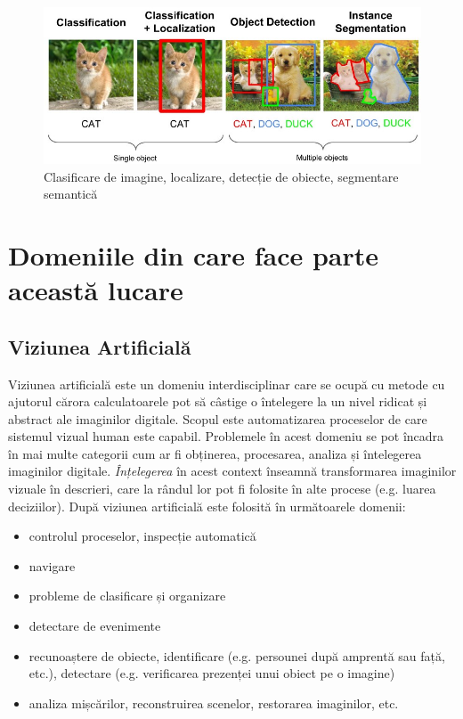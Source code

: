 \begin{figure}[h!]
    	\centering
	\captionsetup{justification=centering, margin=2cm}
	\includegraphics[width=1.0\textwidth]{figures/class_detect_segment.jpeg}
	\caption{Clasificare de imagine, localizare, detecție de obiecte, segmentare semantică \cite{class_detect_segment}}
	\label{fig:class_detect_semgent}
\end{figure}
\section{Domeniile din care face parte această lucare}
\subsection{Viziunea Artificială}
Viziunea artificială este un domeniu interdisciplinar care se ocupă cu metode cu ajutorul cărora calculatoarele pot să câstige o întelegere la un nivel ridicat și abstract ale imaginilor digitale. Scopul este automatizarea proceselor de care sistemul vizual human este capabil.\newline
Problemele în acest domeniu se pot încadra în mai multe categorii cum ar fi obținerea, procesarea, analiza și întelegerea imaginilor digitale. \textit{Înțelegerea} în acest context înseamnă transformarea imaginilor vizuale în descrieri, care la rândul lor pot fi folosite în alte procese (e.g. luarea deciziilor). După \cite{Szeliski10computervision} viziunea artificială este folosită în următoarele domenii:
\begin{itemize}
	\item controlul proceselor, inspecție automatică
	\item navigare
	\item probleme de clasificare și organizare
	\item detectare de evenimente
	\item recunoaștere de obiecte, identificare (e.g. persounei după amprentă sau față, etc.), detectare (e.g. verificarea prezenței unui obiect pe o imagine)
	\item analiza mișcărilor, reconstruirea scenelor, restorarea imaginilor, etc.
\end{itemize}
